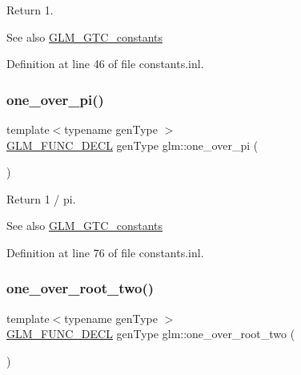 Return 1. \begin{DoxySeeAlso}{See also}
\hyperlink{group__gtc__constants}{G\+L\+M\+\_\+\+G\+T\+C\+\_\+constants} 
\end{DoxySeeAlso}


Definition at line 46 of file constants.\+inl.

\mbox{\label{group__gtc__constants_ga9ba09a027db6d4f4e259b01cf5d6c178}} 
\subsubsection{\texorpdfstring{one\+\_\+over\+\_\+pi()}{one\_over\_pi()}}
{\footnotesize\ttfamily template$<$typename gen\+Type $>$ \\
\hyperlink{setup_8hpp_ab2d052de21a70539923e9bcbf6e83a51}{G\+L\+M\+\_\+\+F\+U\+N\+C\+\_\+\+D\+E\+CL} gen\+Type glm\+::one\+\_\+over\+\_\+pi (\begin{DoxyParamCaption}{ }\end{DoxyParamCaption})}

Return 1 / pi. \begin{DoxySeeAlso}{See also}
\hyperlink{group__gtc__constants}{G\+L\+M\+\_\+\+G\+T\+C\+\_\+constants} 
\end{DoxySeeAlso}


Definition at line 76 of file constants.\+inl.

\mbox{\label{group__gtc__constants_gac1a9b3248357fd9e9b740bed90e0b1b7}} 
\subsubsection{\texorpdfstring{one\+\_\+over\+\_\+root\+\_\+two()}{one\_over\_root\_two()}}
{\footnotesize\ttfamily template$<$typename gen\+Type $>$ \\
\hyperlink{setup_8hpp_ab2d052de21a70539923e9bcbf6e83a51}{G\+L\+M\+\_\+\+F\+U\+N\+C\+\_\+\+D\+E\+CL} gen\+Type glm\+::one\+\_\+over\+\_\+root\+\_\+two (\begin{DoxyParamCaption}{ }\end{DoxyParamCaption})}

